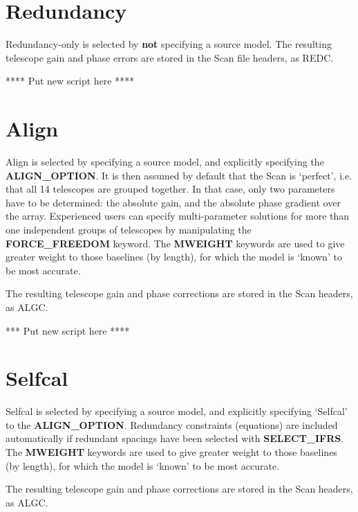 \section{Redundancy}  
\label{.redundancy}  

        Redundancy-only is selected by {\bf not} specifying a source model. The
resulting telescope gain and phase errors are stored in the Scan file headers,
as REDC.  

**** Put new script here ****  


\section{Align}  
\label{.align}  

        Align is selected by specifying a source model, and explicitly
specifying the {\bf ALIGN\_OPTION}.  It is then assumed by default that the
Scan is `perfect', i.e.  that all 14 telescopes are grouped together.  In that
case, only two parameters have to be determined: the absolute gain, and the
absolute phase gradient over the array. Experienced users can specify
multi-parameter solutions for more than one independent groups of telescopes by
manipulating the {\bf FORCE\_FREEDOM} keyword.  The {\bf MWEIGHT} keywords are
used to give greater weight to those baselines (by length), for which the model
is `known' to be most accurate.  

        The resulting telescope gain and phase corrections are stored in the
Scan headers, as ALGC.  

*** Put new script here ****  

\section{Selfcal}  
\label{.selfcal}  

        Selfcal is selected by specifying a source model, and explicitly
specifying `Selfcal' to the {\bf ALIGN\_OPTION}.  Redundancy constraints
(equations) are included automatically if redundant spacings have been selected
with {\bf SELECT\_IFRS}.  The {\bf MWEIGHT} keywords are used to give greater
weight to those baselines (by length), for which the model is `known' to be
most accurate.  

        The resulting telescope gain and phase corrections are stored in the
Scan headers, as ALGC.  

